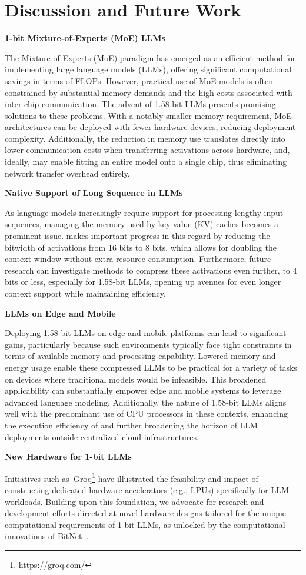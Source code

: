 \section{Discussion and Future Work}

\textbf{1-bit Mixture-of-Experts (MoE) LLMs}

The Mixture-of-Experts (MoE) paradigm has emerged as an efficient method for implementing large language models (LLMs), offering significant computational savings in terms of FLOPs. However, practical use of MoE models is often constrained by substantial memory demands and the high costs associated with inter-chip communication. The advent of 1.58-bit LLMs presents promising solutions to these problems. With a notably smaller memory requirement, MoE architectures can be deployed with fewer hardware devices, reducing deployment complexity. Additionally, the reduction in memory use translates directly into lower communication costs when transferring activations across hardware, and, ideally, may enable fitting an entire model onto a single chip, thus eliminating network transfer overhead entirely.

\textbf{Native Support of Long Sequence in LLMs}

As language models increasingly require support for processing lengthy input sequences, managing the memory used by key-value (KV) caches becomes a prominent issue.  makes important progress in this regard by reducing the bitwidth of activations from 16 bits to 8 bits, which allows for doubling the context window without extra resource consumption. Furthermore, future research can investigate methods to compress these activations even further, to 4 bits or less, especially for 1.58-bit LLMs, opening up avenues for even longer context support while maintaining efficiency.

\textbf{LLMs on Edge and Mobile}

Deploying 1.58-bit LLMs on edge and mobile platforms can lead to significant gains, particularly because such environments typically face tight constraints in terms of available memory and processing capability. Lowered memory and energy usage enable these compressed LLMs to be practical for a variety of tasks on devices where traditional models would be infeasible. This broadened applicability can substantially empower edge and mobile systems to leverage advanced language modeling. Additionally, the nature of 1.58-bit LLMs aligns well with the predominant use of CPU processors in these contexts, enhancing the execution efficiency of  and further broadening the horizon of LLM deployments outside centralized cloud infrastructures.

\textbf{New Hardware for 1-bit LLMs}

Initiatives such as~Groq\footnote{\url{https://groq.com/}} have illustrated the feasibility and impact of constructing dedicated hardware accelerators (e.g., LPUs) specifically for LLM workloads. Building upon this foundation, we advocate for research and development efforts directed at novel hardware designs tailored for the unique computational requirements of 1-bit LLMs, as unlocked by the computational innovations of BitNet~\cite{bitnet}. 

